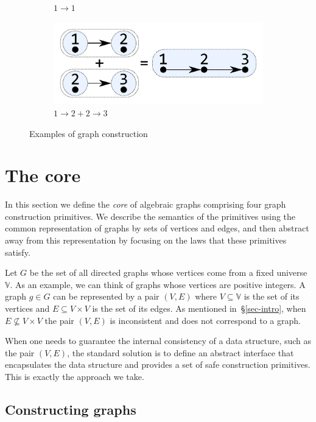 \begin{figure}
\begin{subfigure}[b]{0.15\linewidth}
\vspace{2.4mm}
\caption{$1 \rightarrow 1$}
\end{subfigure}
\hspace{12mm}
\begin{subfigure}[b]{0.2\linewidth}
\centerline{\includegraphics[scale=0.27]{fig/ex-e-new.pdf}}
\vspace{-1mm}
\caption{$1 \rightarrow 2 + 2 \rightarrow 3$}
\end{subfigure}
\caption{Examples of graph construction\label{fig-construction}}
\end{figure}

\section{The core}\label{sec-core}
In this section we define the \emph{core} of algebraic graphs comprising
four graph construction primitives. We describe the semantics of the primitives
using the common representation of graphs by sets of vertices and edges, and
then abstract away from this representation by focusing on the laws that these
primitives satisfy.

Let $G$ be the set of all directed graphs whose vertices come from a fixed
universe $\mathbb{V}$. As an example, we can think of graphs whose vertices are
positive integers. A graph $g \in G$ can be represented by a pair $(V, E)$ where
$V\subseteq \mathbb{V}$ is the set of its vertices and $E \subseteq V \times V$ is
the set of its edges. As mentioned in~\S\ref{sec-intro}, when $E \nsubseteq V \times V$
the pair $(V, E)$ is inconsistent and does not correspond to a graph.

When one needs to guarantee the internal consistency of a data structure, such
as the pair $(V, E)$, the standard solution is to define an abstract interface
that encapsulates the data structure and provides a set of safe construction
primitives. This is exactly the approach we take.

\subsection{Constructing graphs}\label{sub-constructing}

